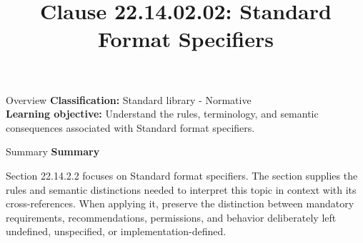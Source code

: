 \documentclass[10pt,letterpaper]{article}
\title{Clause 22.14.02.02: Standard Format Specifiers}
\author{}
\date{}
\begin{document}
\maketitle
\begin{CornellOverviewBox}{Overview}
\textbf{Classification:} Standard library - Normative\\[2pt]
\textbf{Learning objective:} Understand the rules, terminology, and semantic consequences associated with Standard format specifiers.
\end{CornellOverviewBox}\begin{CornellSummaryBox}{Summary}
{\sffamily\bfseries\color{Accent} Summary}\par\vspace{3pt}Section 22.14.2.2 focuses on Standard format specifiers. The section supplies the rules and semantic distinctions needed to interpret this topic in context with its cross-references. When applying it, preserve the distinction between mandatory requirements, recommendations, permissions, and behavior deliberately left undefined, unspecified, or implementation-defined.
\end{CornellSummaryBox}
\end{document}
